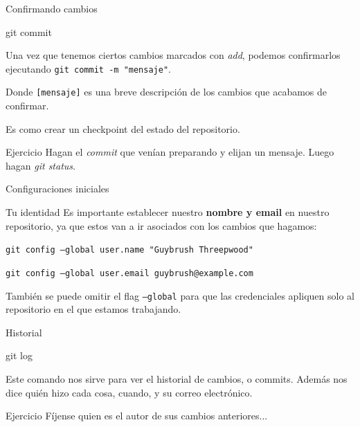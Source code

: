 \begin{frame}[t]{Confirmando cambios}
    \begin{comando}
        git commit
    \end{comando}

    \pause
    \begin{block}{}
        Una vez que tenemos ciertos cambios marcados con \textit{add}, podemos confirmarlos
        ejecutando \texttt{git commit -m "mensaje"}.

        \vspace{0.5em}

        Donde \texttt{[mensaje]} es una breve descripción de los cambios que acabamos de confirmar.
        
        \pause
        Es como crear un checkpoint del estado del repositorio.
    \end{block}

    \pause
    \begin{ejercicio}{Ejercicio}
        Hagan el \textit{commit} que venían preparando y elijan un mensaje. Luego hagan \textit{git status}.
    \end{ejercicio}
\end{frame}



\begin{frame}[fragile]{Configuraciones iniciales}

    \begin{block}{Tu identidad}
        Es importante establecer nuestro \textbf{nombre y email} en nuestro repositorio, ya que estos van a ir asociados con los cambios que hagamos:

        \vspace{0.5em}

        \texttt{git config --global user.name "Guybrush Threepwood"}

        \texttt{git config --global user.email guybrush@example.com}


    También se puede omitir el flag \texttt{--global} para que las credenciales apliquen solo al repositorio en el que estamos trabajando.
        \end{block}
\end{frame}

\begin{frame}{Historial}
 \begin{comando}
     git log
 \end{comando}
 \pause
 \begin{block}{}
     Este comando nos sirve para ver el historial de cambios, o commits. Además nos dice quién hizo cada cosa, cuando, y su correo electrónico.
     
 \end{block}
    \begin{ejercicio}{Ejercicio}
        Fíjense quien es el autor de sus cambios anteriores... 
    \end{ejercicio}
\end{frame}

